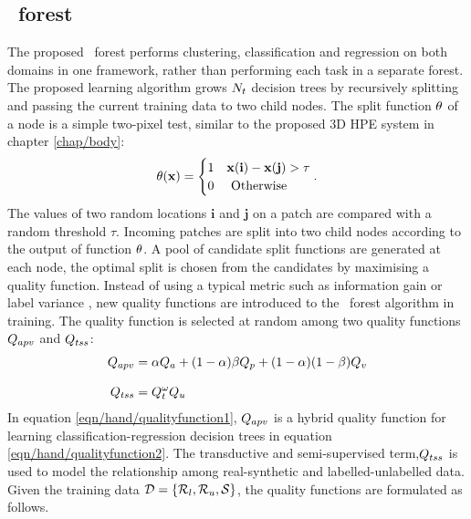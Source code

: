 \subsection{\STR\ forest} 
\label{sec/hand/strforest}
The proposed \STR\ forest performs clustering, classification and regression on both domains in one framework, rather than performing each task in a separate forest. 
The proposed learning algorithm grows $N_{t}$ decision trees by recursively splitting and passing the current training data to two child nodes. 
The split function $\theta$ of a node is a simple two-pixel test, similar to the proposed 3D HPE system in chapter \ref{chap/body}: 
\begin{equation}
	\theta(\mathbf{x}) = \begin{cases} 
		1 & \mathbf{x}(\textbf{i})-\mathbf{x}(\textbf{j}) > \tau \\
		0 & \mbox{ Otherwise } \\
	\end{cases}.
	\label{eqn/hand/pixeltest}
\end{equation}
The values of two random locations $\textbf{i}$ and $\textbf{j}$ on a patch are compared with a random threshold $\tau$. Incoming patches are split into two child nodes according to the output of function $\theta$. 
A pool of candidate split functions are generated at each node, the optimal split is chosen from the candidates by maximising a quality function.   
Instead of using a typical metric such as information gain \cite{Breiman2001} or label variance \cite{Shotton2013}, new quality functions are introduced to the \STR\ forest algorithm in training. The quality function is selected at random among two quality functions $Q_{apv}$ and $Q_{tss}$: 
\begin{align}
	\label{eqn/hand/qualityfunction1}
	Q_{apv} & = \alpha Q_{a} + (1 - \alpha)\beta Q_{p} + (1 - \alpha)(1 - \beta)Q_{v}  \\[3mm] 
	\label{eqn/hand/qualityfunction2}
	Q_{tss} & = Q_{t}^{\omega}Q_{u}
\end{align}
In equation \ref{eqn/hand/qualityfunction1}, $Q_{apv}$ is a hybrid quality function for learning classification-regression decision trees in equation \ref{eqn/hand/qualityfunction2}. The transductive and semi-supervised term,$Q_{tss}$ is used to model the relationship among real-synthetic and labelled-unlabelled data. Given the training data $\mathcal{D} = \{\mathcal{R}_{l}, \mathcal{R}_{u}, \mathcal{S}\}$, the quality functions are formulated as follows.   


